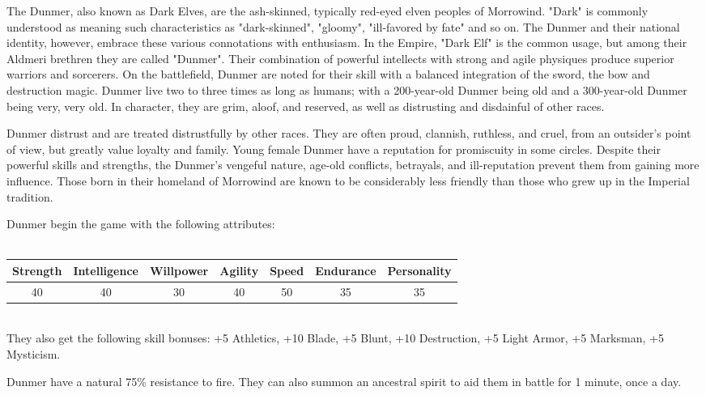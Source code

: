 \documentclass[12pt]{article}
\begin{document}
The Dunmer, also known as Dark Elves, are the ash-skinned, typically red-eyed elven peoples of Morrowind. "Dark" is commonly understood as meaning such characteristics as "dark-skinned", "gloomy", "ill-favored by fate" and so on. The Dunmer and their national identity, however, embrace these various connotations with enthusiasm. In the Empire, "Dark Elf" is the common usage, but among their Aldmeri brethren they are called "Dunmer". Their combination of powerful intellects with strong and agile physiques produce superior warriors and sorcerers. On the battlefield, Dunmer are noted for their skill with a balanced integration of the sword, the bow and destruction magic. Dunmer live two to three times as long as humans; with a 200-year-old Dunmer being old and a 300-year-old Dunmer being very, very old. In character, they are grim, aloof, and reserved, as well as distrusting and disdainful of other races.

Dunmer distrust and are treated distrustfully by other races. They are often proud, clannish, ruthless, and cruel, from an outsider's point of view, but greatly value loyalty and family. Young female Dunmer have a reputation for promiscuity in some circles. Despite their powerful skills and strengths, the Dunmer's vengeful nature, age-old conflicts, betrayals, and ill-reputation prevent them from gaining more influence. Those born in their homeland of Morrowind are known to be considerably less friendly than those who grew up in the Imperial tradition.

Dunmer begin the game with the following attributes:\\~\\
\begin{tabular}{|c|c|c|c|c|c|c|}
\hline
Strength & Intelligence & Willpower & Agility & Speed & Endurance & Personality\\ \hline
40 & 40 & 30 & 40 & 50 & 35 & 35\\ \hline

\end{tabular}\\

They also get the following skill bonuses: +5 Athletics, +10 Blade, +5 Blunt, +10 Destruction, +5 Light Armor, +5 Marksman, +5 Mysticism.

Dunmer have a natural 75\% resistance to fire. They can also summon an ancestral spirit to aid them in battle for 1 minute, once a day.\\
\end{document}
